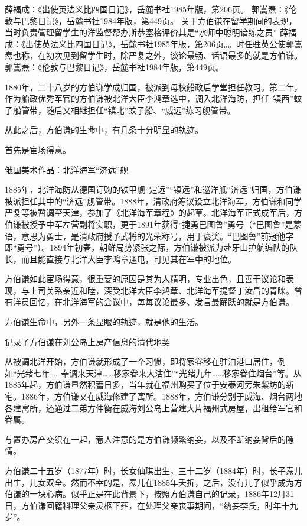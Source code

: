 \documentclass[12pt,UTF8]{ctexbook}
\begin{document}
薛福成：《出使英法义比四国日记》，岳麓书社1985年版，第206页。
郭嵩焘：《伦敦与巴黎日记》，岳麓书社1984年版，第449页。
关于方伯谦在留学期间的表现，当时负责管理留学生的洋监督帮办斯恭塞格评价其是“水师中聪明谙练之员” 薛福成：《出使英法义比四国日记》，岳麓书社1985年版，第206页。。时任驻英公使郭嵩焘也称，在初次见到留学生时，除严复之外，谈论最畅、话语最多的就是方伯谦。 郭嵩焘：《伦敦与巴黎日记》，岳麓书社1984年版，第449页。

1880年，二十八岁的方伯谦学成归国，被派到母校船政后学堂担任教习。第二年，作为船政优秀军官的方伯谦被北洋大臣李鸿章选中，调入北洋海防，担任“镇西”蚊子船管带，随后又相继担任“镇北”蚊子船、“威远”练习舰管带。

从此之后，方伯谦的生命中，有几条十分明显的轨迹。

首先是宦场得意。


俄国美术作品：北洋海军“济远”舰

1885年，北洋海防从德国订购的铁甲舰“定远”“镇远”和巡洋舰“济远”归国，方伯谦被派担任其中的“济远”舰管带。1888年，清政府筹议设立北洋海军，方伯谦和同学严复等被暂调至天津，参加了《北洋海军章程》的起草。北洋海军正式成军后，方伯谦被授予中军左营副将实职，更于1891年获得“捷勇巴图鲁”勇号（“巴图鲁”是蒙语，意思为勇士，是清政府授予武将的光荣称号，用于褒奖。“巴图鲁”前冠他字即“勇号”）。1894年初春，朝鲜局势紧张之际，方伯谦被派为赴牙山护航编队的队长，而且能直接与北洋大臣李鸿章通电，可见其在军中的地位。

方伯谦如此宦场得意，很重要的原因是其为人精明，专业出色，且善于议论和表现，与上司关系亲近和睦，深受北洋大臣李鸿章、北洋海军提督丁汝昌的青睐。曾有洋员回忆，在北洋海军的会议中，每每议论最多、发言最踊跃的就是方伯谦。

方伯谦生命中，另外一条显眼的轨迹，就是他的生活。


记录了方伯谦在刘公岛上房产信息的清代地契

从被调北洋开始，方伯谦就形成了一个习惯，即将家眷移在驻泊港口居住，例如“光绪七年……奉调来天津……移家眷来大沽住”“光绪九年……移家眷住烟台”等。从1885年起，方伯谦显然积蓄日多，当年就在福州购买了位于安泰河旁朱紫坊的新宅。1886年，方伯谦又在威海修建了寓所。1888年，方伯谦分别于威海、烟台两地各建寓所，还通过二弟方仲衡在威海刘公岛上营建大片福州式房屋，出租给军官和眷属。

与置办房产交织在一起，惹人注意的是方伯谦频繁纳妾，以及不断纳妾背后的隐情。

方伯谦二十五岁（1877年）时，长女仙琪出生，三十二岁（1884年）时，长子焘儿出生，儿女双全。然而不幸的是，焘儿在1885年夭折，之后，没有儿子似乎成为方伯谦的一块心病。似乎正是在此背景下，按照方伯谦自己的记录，1886年12月31日，方伯谦回籍料理父亲灵柩下葬，在处理父亲丧事期间，“纳妾李氏，时年十九岁”。
\end{document}
